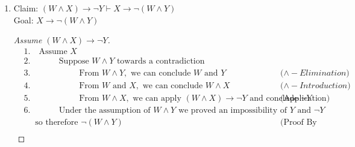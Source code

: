\documentclass{article}
\begin{document}
\begin{enumerate}
\begin{enumerate}
\begin{proof}[Assume $(W \land X) \rightarrow \neg Y, X$]
\begin{align*}
                &4. \quad \hspace{1cm} \text{From } W \text{ and } X, \text{ we can conclude } W \land X && \text{($\land - Introduction$)} \\
                &5. \quad \hspace{1cm} \text{From } W \land X, \text{ we can apply } (W \land X) \rightarrow \neg Y \text{ and conclude } \neg Y && \text{(Application)} \\
                &6. \quad \text{Under the assumption of } W \land Y \text{ we proved an impossibility of } Y \text{ and } \neg Y \\
                &\quad \text{ so therefore } \neg (W \land Y) && \text{(Proof By Contradiction)} \\
            \end{align*}
        \end{proof}
        \item
        Claim: $(W \land X) \rightarrow \neg Y \vdash X \rightarrow \neg (W \land Y)$ \\
        Goal: $X \rightarrow \neg (W \land Y)$
        \begin{proof}[Assume $(W \land X) \rightarrow \neg Y$]
            \begin{align*}
                &1. \quad \text{Assume } X \\
                &2. \quad \hspace{1cm} \text{Suppose } W \land Y \text{ towards a contradiction} \\
                &3. \quad \hspace{2cm} \text{From } W \land Y, \text{ we can conclude } W \text{ and } Y && \text{($\land - Elimination$)} \\
                &4. \quad \hspace{2cm} \text{From } W \text{ and } X, \text{ we can conclude } W \land X && \text{($\land - Introduction$)} \\
                &5. \quad \hspace{2cm} \text{From } W \land X, \text{ we can apply } (W \land X) \rightarrow \neg Y \text{ and conclude } \neg Y && \text{(Application)} \\
                &6. \quad \hspace{1cm} \text{Under the assumption of } W \land Y \text{ we proved an impossibility of } Y \text{ and } \neg Y \\
                &\quad \text{ so therefore } \neg (W \land Y) && \text{(Proof By Contradiction)} \\

\end{align*}
\end{proof}
\end{enumerate}
\end{enumerate}
\end{document}
